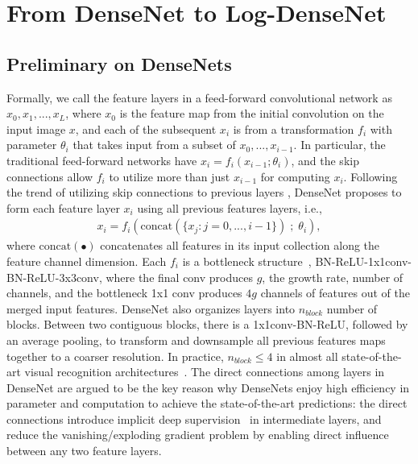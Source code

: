 \documentclass{article}
\newcommand{\concat}{\text{concat}}
\newcommand{\logdense}{Log-DenseNet\xspace}
\newcommand{\loglogdense}{LogLog-DenseNet\xspace}
\begin{document}
\section{From DenseNet to \logdense} %
\subsection{Preliminary on DenseNets}
\label{sec:densenet-preliminary}
Formally, we call the feature layers in a feed-forward convolutional network as $x_0, x_1,..., x_L$, where $x_0$ is the feature map from the initial convolution on the input image $x$, and each of the subsequent $x_i$ is from a transformation $f_i$ with parameter $\theta_i$ that takes input from a subset of $x_0,...,x_{i-1}$. In particular, the traditional feed-forward networks have $x_i = f_i(x_{i-1}; \theta_i)$, and the skip connections allow $f_i$ to utilize more than just $x_{i-1}$ for computing $x_i$. Following the trend of utilizing skip connections to previous layers \citep{resnet, highwaynet, fractalnet}, DenseNet \citep{densenet} proposes to form each feature layer $x_i$ using all previous features layers, i.e., 
\begin{align}
   x_i = f_i( \concat(\{ x_j : j = 0,..., i-1\} )\;; \; \theta_i),
\end{align}
where $\concat(\bullet)$ concatenates all features in its input collection along the feature channel dimension. Each $f_i$ is a bottleneck structure~\citep{densenet}, BN-ReLU-1x1conv-BN-ReLU-3x3conv, where the final conv produces $g$, the growth rate, number of channels, and the bottleneck 1x1 conv produces $4g$ channels of features out of the merged input features. DenseNet also organizes layers into $n_{block}$ number of blocks. Between two contiguous blocks, there is a 1x1conv-BN-ReLU, followed by an average pooling, to transform and downsample all previous features maps together to a coarser resolution. In practice, $n_{block} \leq 4$ in almost all state-of-the-art visual recognition architectures~\citep{resnet, inception_v4, densenet}. 
The direct connections among layers in DenseNet are argued to be the key reason why DenseNets enjoy high efficiency in parameter and computation to achieve the state-of-the-art predictions: the direct connections introduce implicit deep supervision~\citep{supervisednet} in intermediate layers, and reduce the vanishing/exploding gradient problem by enabling direct influence between any two feature layers.

\end{document}
